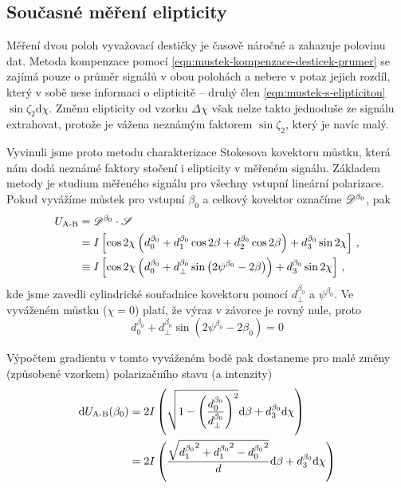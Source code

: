 \subsection{Současné měření elipticity}
\label{chap:elipticita}

Měření dvou poloh vyvažovací destičky je časově náročné a zahazuje polovinu dat.
Metoda kompenzace pomocí \eqref{eqn:mustek-kompenzace-desticek-prumer} se zajímá pouze o průměr signálů v obou polohách a nebere v potaz jejich rozdíl, který v sobě nese informaci o elipticitě -- druhý člen \eqref{eqn:mustek-s-elipticitou} $\sin\zeta_2 \textrm{d}\chi$.
Změnu elipticity od vzorku $\Delta\chi$ však nelze takto jednoduše ze signálu extrahovat, protože je vážena neznámým faktorem $\sin\zeta_2$, který je navíc malý.

Vyvinuli jsme proto metodu charakterizace Stokesova kovektoru můstku, která nám dodá neznámé faktory stočení i elipticity v měřeném signálu.
Základem metody je studium měřeného signálu pro všechny vstupní lineární polarizace.
Pokud vyvážíme můstek pro vstupní $\beta_0$ a celkový kovektor označíme $\mathscr{D}^{\beta_0}$, pak
\begin{align}
\label{eqn:charakterizace-kovektoru-beta}
    U_\textrm{A-B} &= \mathscr{D}^{\beta_0} \cdot \mathscr{S} \\ &= I \left[\cos2\chi\left(d^{\beta_0}_0 + d^{\beta_0}_1 \cos2\beta + d^{\beta_0}_2 \cos2\beta  \right) + d^{\beta_0}_3 \sin2\chi  \right] \,,\\
          &\equiv I \left[ \cos2\chi \left(d^{\beta_0}_0 + d^{\beta_0}_\perp \sin \left( 2\psi^{\beta_0} - 2\beta \right) \right) + d^{\beta_0}_3 \sin2\chi \right] \,,
\end{align}
kde jsme zavedli cylindrické souřadnice kovektoru pomocí $d^{\beta_0}_\perp$ a $\psi^{\beta_0}$.
Ve vyváženém můstku ($\chi=0$) platí, že výraz v závorce je rovný nule, proto
\begin{equation}
    d^{\beta_0}_0 + d^{\beta_0}_\perp \sin \left( 2\psi^{\beta_0} - 2\beta_0 \right) = 0
\end{equation}

Výpočtem gradientu v tomto vyváženém bodě pak dostaneme pro malé změny (způsobené vzorkem) polarizačního stavu (a intenzity)
\begin{align}
    \textrm{d}U_\textrm{A-B}(\beta_0) &= 2I \left(\sqrt{1 - \left(\frac{d^{\beta_0}_0}{d^{\beta_0}_\perp}\right)^2} \textrm{d}\beta + d^{\beta_0}_3 \textrm{d}\chi  \right) \\
                             &= 2I \left(\frac{\sqrt{{d^{\beta_0}_1}^2 + {d^{\beta_0}_1}^2 - {d^{\beta_0}_0}^2}}{d} \textrm{d}\beta + d^{\beta_0}_3 \textrm{d}\chi  \right) 
\end{align}

